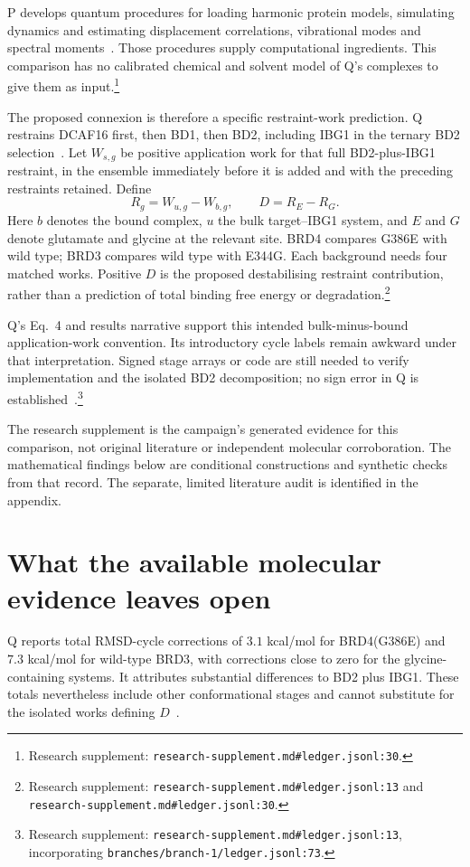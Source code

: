 \documentclass{article}
\begin{document}
P develops quantum procedures for loading harmonic protein models, simulating dynamics and estimating displacement correlations, vibrational modes and spectral moments~\cite{P}. Those procedures supply computational ingredients. This comparison has no calibrated chemical and solvent model of Q's complexes to give them as input.\footnote{Research supplement: \nolinkurl{research-supplement.md#ledger.jsonl:30}.}

The proposed connexion is therefore a specific restraint-work prediction. Q restrains DCAF16 first, then BD1, then BD2, including IBG1 in the ternary BD2 selection~\cite{Q}. Let \(W_{s,g}\) be positive application work for that full BD2-plus-IBG1 restraint, in the ensemble immediately before it is added and with the preceding restraints retained. Define
\[
 R_g=W_{u,g}-W_{b,g},\qquad D=R_E-R_G.
\]
Here \(b\) denotes the bound complex, \(u\) the bulk target--IBG1 system, and \(E\) and \(G\) denote glutamate and glycine at the relevant site. BRD4 compares G386E with wild type; BRD3 compares wild type with E344G. Each background needs four matched works. Positive \(D\) is the proposed destabilising restraint contribution, rather than a prediction of total binding free energy or degradation.\footnote{Research supplement: \nolinkurl{research-supplement.md#ledger.jsonl:13} and \nolinkurl{research-supplement.md#ledger.jsonl:30}.}

Q's Eq.~4 and results narrative support this intended bulk-minus-bound application-work convention. Its introductory cycle labels remain awkward under that interpretation. Signed stage arrays or code are still needed to verify implementation and the isolated BD2 decomposition; no sign error in Q is established~\cite{Q}.\footnote{Research supplement: \nolinkurl{research-supplement.md#ledger.jsonl:13}, incorporating \nolinkurl{branches/branch-1/ledger.jsonl:73}.}

The research supplement is the campaign's generated evidence for this comparison, not original literature or independent molecular corroboration. The mathematical findings below are conditional constructions and synthetic checks from that record. The separate, limited literature audit is identified in the appendix.

\section{What the available molecular evidence leaves open}

Q reports total RMSD-cycle corrections of \(3.1\) kcal/mol for BRD4(G386E) and \(7.3\) kcal/mol for wild-type BRD3, with corrections close to zero for the glycine-containing systems. It attributes substantial differences to BD2 plus IBG1. These totals nevertheless include other conformational stages and cannot substitute for the isolated works defining \(D\)~\cite{Q}.
\end{document}

